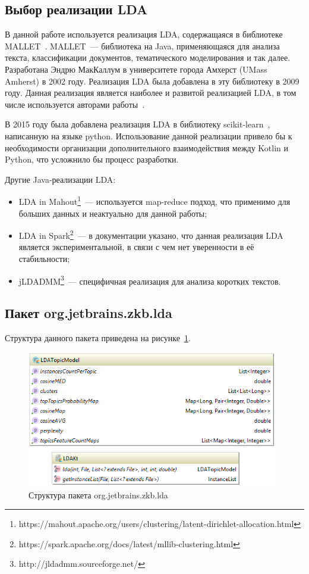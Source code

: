 \subsection{Выбор реализации LDA}
\label{sec:lda_choose}

В данной работе используется реализация LDA, содержащаяся в библиотеке MALLET~\cite{MALLET}. MALLET~--- библиотека на Java, применяющаяся для анализа текста, классификации документов, тематического моделирования и так далее. Разработана Эндрю МакКаллум в университете города Амхерст (UMass Amherst) в 2002 году. Реализация LDA была добавлена в эту библиотеку в 2009 году. Данная реализация является наиболее  и развитой реализацией LDA, в том числе используется авторами работы~\cite{original}.

В 2015 году была добавлена реализация LDA в библиотеку \mbox{scikit-learn}~\cite{scikit-learn-lda}, написанную на языке python. Использование данной реализации привело бы к необходимости организации дополнительного взаимодействия между Kotlin и Python, что усложнило бы процесс разработки.

Другие Java-реализации LDA:
\begin{itemize}
\item LDA in Mahout\footnote{https://mahout.apache.org/users/clustering/latent-dirichlet-allocation.html}~--- используется map-reduce подход, что применимо для больших данных и неактуально для данной работы;
\item LDA in Spark\footnote{https://spark.apache.org/docs/latest/mllib-clustering.html}~--- в документации указано, что данная реализация LDA является экспериментальной, в связи с чем нет уверенности в её стабильности;
\item jLDADMM\footnote{http://jldadmm.sourceforge.net/}~--- специфичная реализация для анализа коротких текстов.
\end{itemize}

\subsection{Пакет org.jetbrains.zkb.lda}

Структура данного пакета приведена на рисунке~\ref{fig:lda}.

\begin{figure}[tph!]
\centerline{\includegraphics[width=11cm]{fig/lda.png}}
    \caption{Структура пакета org.jetbrains.zkb.lda}
    \label{fig:lda}
\end{figure}

